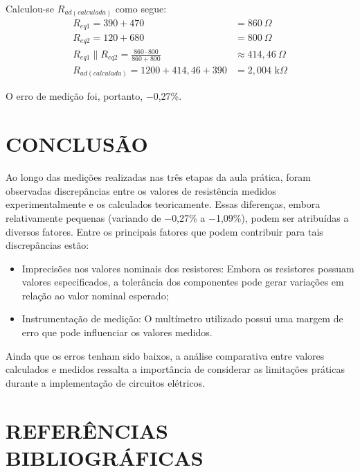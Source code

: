 \documentclass[12pt]{article}
\begin{document}
    Calculou-se $R_{ad(calculada)}$ como segue:
    \begin{align*}
        R_{eq1}=390 + 470 &= 860\ \Omega\\
        R_{eq2}=120 + 680 &= 800\ \Omega\\
        R_{eq1}\parallel R_{eq2} = \frac{860\cdot 800}{860 + 800} &\approx 414,46\ \Omega\\
        R_{ad(calculada)}=1200 + 414,46 + 390 &= 2,004\text{ k}\Omega
    \end{align*}

    O erro de medição foi, portanto, $-$0,27\%.

    \section{CONCLUSÃO}
    Ao longo das medições realizadas nas três etapas da aula prática, foram observadas discrepâncias entre os valores de resistência medidos experimentalmente e os calculados teoricamente. Essas diferenças, embora relativamente pequenas (variando de $-$0,27\% a $-$1,09\%), podem ser atribuídas a diversos fatores. Entre os principais fatores que podem contribuir para tais discrepâncias estão:
    \begin{itemize}
        \item Imprecisões nos valores nominais dos resistores: Embora os resistores possuam valores especificados, a tolerância dos componentes pode gerar variações em relação ao valor nominal esperado;
        \item Instrumentação de medição: O multímetro utilizado possui uma margem de erro que pode influenciar os valores medidos.
    \end{itemize}  

    Ainda que os erros tenham sido baixos, a análise comparativa entre valores calculados e medidos ressalta a importância de considerar as limitações práticas durante a implementação de circuitos elétricos.

    \newpage
    \section*{\hfill REFERÊNCIAS BIBLIOGRÁFICAS\hfill}
    \printbibliography[heading=none]
\end{document}
